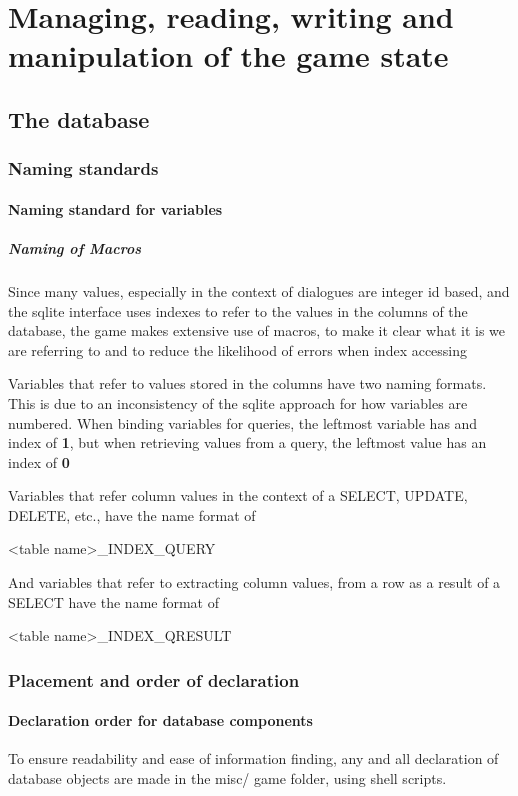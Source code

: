 \documentclass{report}
\begin{document}
\section*{Managing, reading, writing and manipulation of the game state}
\subsection*{The database}
\subsubsection*{Naming standards}
\paragraph*{Naming standard for variables}
\subparagraph*{Naming of Macros}
Since many values, especially in the context of dialogues are integer id based, and the sqlite interface uses indexes to refer to the values in the columns of the database, the game makes extensive use of macros, to make it clear what it is we are referring to and to reduce the likelihood of errors when index accessing \newline

Variables that refer to values stored in the columns have two naming formats. This is due to an inconsistency of the sqlite approach for how variables are numbered. When binding variables for queries, the leftmost variable has and index of \textbf{1}, but when retrieving values from a query, the leftmost value has an index of \textbf{0}

Variables that refer column values in the context of a SELECT, UPDATE, DELETE, etc., have the name format of 

\begin{center}
<table name>\_<column name>INDEX\_QUERY
\end{center}

And variables that refer to extracting column values, from a row as a result of a SELECT have the name format of

\begin{center}
<table name>\_<column name>INDEX\_QRESULT
\end{center}
\subsubsection*{Placement and order of declaration}
\paragraph*{Declaration order for database components}
To ensure readability and ease of information finding, any and all declaration of database objects are made in the misc/ game folder, using shell scripts.
\end{document}
